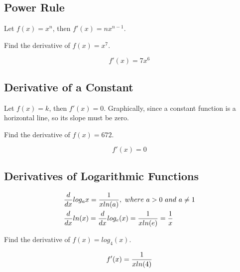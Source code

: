 \subsection{Power Rule}

\begin{theorem}
    Let $ f(x) = x^n $, then $ f'(x) = nx^{n-1} $.
\end{theorem}

\begin{exercise}\nonumber
    Find the derivative of $ f(x) = x^7 $.

    $$
        f'(x) = 7x^6
    $$
\end{exercise}

\subsection{Derivative of a Constant}

\begin{theorem}
    Let $ f(x) = k $, then $ f'(x) = 0 $. Graphically, since a constant function is a horizontal line, so its slope must be zero.
\end{theorem}

\begin{exercise}\nonumber
    Find the derivative of $ f(x) = 672 $.

    $$
        f'(x) = 0
    $$
\end{exercise}

\subsection{Derivatives of Logarithmic Functions}

\begin{theorem}
    \begin{align}
         & {d \over dx}log_a{x} = {1 \over xln(a)},\ where\ a > 0\ and\ a \neq 1     \\
         & {d \over dx}ln(x) = {d \over dx}log_e(x) = {1 \over xln(e)} = {1 \over x}
    \end{align}
\end{theorem}

\begin{exercise}\nonumber
    Find the derivative of $ f(x) = log_4(x) $.

    $$
        f'(x) = {1 \over xln(4)}
    $$
\end{exercise}

